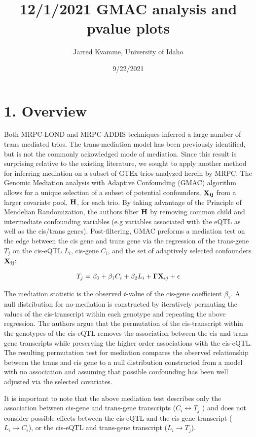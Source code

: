 \documentclass[
]{article}
\title{12/1/2021 GMAC analysis and pvalue plots}
\author{Jarred Kvamme, University of Idaho}
\date{9/22/2021}
\begin{document}
\maketitle

\section*{1. Overview}

Both MRPC-LOND and MRPC-ADDIS techniques inferred a large number of
trans mediated trios. The trans-mediation model has been previously
identified, but is not the commonly ackowledged mode of mediation. Since
this result is surprising relative to the existing literature, we sought
to apply another method for inferring mediation on a subset of GTEx
trios analyzed herein by MRPC. The Genomic Mediation analysis with
Adaptive Confounding (GMAC) algorithm allows for a unique selection of a
subset of potential confounders, \({\bf X_{ij}}\) from a larger
covariate pool, \({\bf H}\), for each trio. By taking advantage of the
Principle of Mendelian Randomization, the authors filter \({\bf H}\) by
removing common child and intermediate confounding variables (e.g
variables associated with the eQTL as well as the cis/trans genes).
Post-filtering, GMAC preforms a mediation test on the edge between the
cis gene and trans gene via the regression of the trans-gene \(T_j\) on
the cis-eQTL \(L_i\), cis-gene \(C_i\), and the set of adaptively
selected confounders \({\bf X_{ij}}\):

\begin{eqnarray} T_j = \beta_0 + \beta_1 C_i + \beta_2 L_i + {\bf \Gamma} {\bf X}_{ij} + \epsilon \end{eqnarray}

The mediation statistic is the observed \(t\)-value of the cis-gene
coefficient \(\beta_1\). A null distribution for no-mediation is
constructed by iteratively permuting the values of the cis-transcript
within each genotype and repeating the above regression. The authors
argue that the permutation of the cis-transcript within the genotypes of
the cis-eQTL removes the association between the cis and trans gene
transcripts while preserving the higher order associations with the
cis-eQTL. The resulting permutation test for mediation compares the
observed relationship between the trans and cis gene to a null
distribution constructed from a model with no association and assuming
that possible confounding has been well adjusted via the selected
covariates.

It is important to note that the above mediation test describes only the
association between cis-gene and trans-gene transcripts
(\(C_i \leftrightarrow T_j\) ) and does not consider possible effects
between the cis-eQTL and the cis-gene transcript
(\(L_i \rightarrow C_i\)), or the cis-eQTL and trans-gene transcript
(\(L_i \rightarrow T_j\)).
\end{document}
